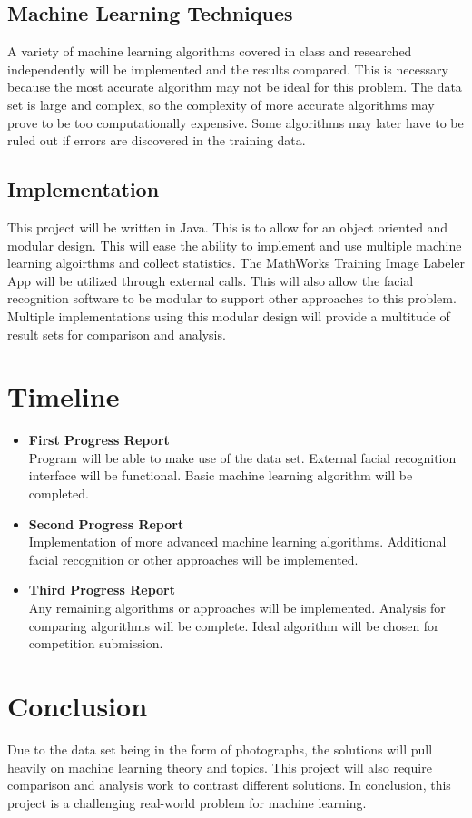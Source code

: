 \documentclass[11pt]{article}
\newcommand{\?}{\stackrel{?}{=}}
\begin{document}
\subsection{Machine Learning Techniques}
A variety of machine learning algorithms covered in class and researched independently
will be implemented and the results compared. This is necessary because the most 
accurate algorithm may not be ideal for this problem. The data set is large and 
complex, so the complexity of more accurate algorithms may prove to be too 
computationally expensive. Some algorithms may later have to be ruled out 
if errors are discovered in the training data. 

\subsection{Implementation}
This project will be written in Java. This is to allow for an object oriented
and modular design. This will ease the ability to implement and use multiple
machine learning algoirthms and collect statistics. The MathWorks Training
Image Labeler App will be utilized through external calls\cite{kaggle_face}. This 
will also allow the facial recognition software to be modular to support 
other approaches to this problem. Multiple implementations using this modular 
design will provide a multitude of result sets for comparison and analysis.

\section{Timeline}
\begin{itemize}
\item[~]
\textbf{First Progress Report}\\
Program will be able to make use of the data set. External facial recognition 
interface will be functional. Basic machine learning algorithm will be completed.
\item[~]
\textbf{Second Progress Report}\\
Implementation of more advanced machine learning algorithms. Additional facial
recognition or other approaches will be implemented.
\item[~]
\textbf{Third Progress Report}\\
Any remaining algorithms or approaches will be implemented. Analysis for comparing
algorithms will be complete. Ideal algorithm will be chosen for competition submission.
\end{itemize}

\section{Conclusion}
Due to the data set being in the form of photographs, the solutions will pull 
heavily on machine learning theory and topics. This project will also require 
comparison and analysis work to contrast different solutions. In conclusion, 
this project is a challenging real-world problem for machine learning.

\newpage

\nocite{*}
\end{document}
